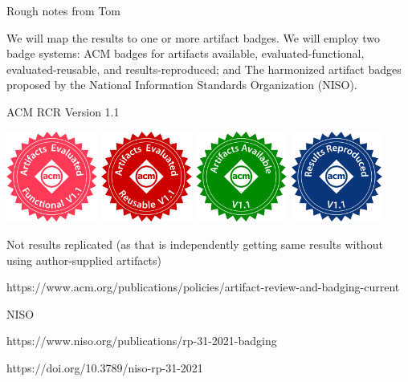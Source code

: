 Rough notes from Tom

We will map the results to one or more artifact badges. We will employ two badge systems:
ACM badges for artifacts available, evaluated-functional, evaluated-reusable, and results-reproduced; and
The harmonized artifact badges proposed by the National Information Standards Organization (NISO).

ACM RCR Version 1.1

\includegraphics[width=3cm]{images/artifacts_evaluated_functional_v1_1.png}
\includegraphics[width=3cm]{images/artifacts_evaluated_reusable_v1_1.png}
\includegraphics[width=3cm]{images/artifacts_available_v1_1.png}
\includegraphics[width=3cm]{images/results_reproduced_v1_1.png}

Not results replicated (as that is independently getting same results without using author-supplied artifacts)

https://www.acm.org/publications/policies/artifact-review-and-badging-current

NISO

https://www.niso.org/publications/rp-31-2021-badging

https://doi.org/10.3789/niso-rp-31-2021

